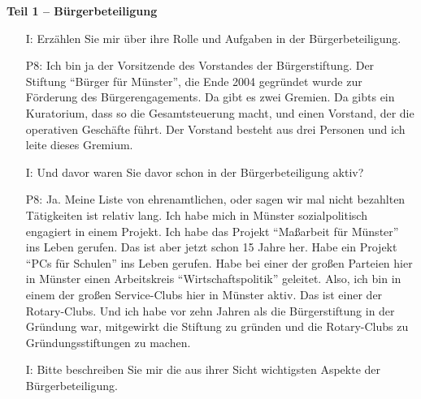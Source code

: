 \textbf{Teil 1 -- B{\"u}rgerbeteiligung}
\begin{itemize}
    \item[I:] Erz{\"a}hlen Sie mir {\"u}ber ihre Rolle und Aufgaben in der B{\"u}rgerbeteiligung.
    \item[P8:] Ich bin ja der Vorsitzende des Vorstandes der B{\"u}rgerstiftung. Der Stiftung "`B{\"u}rger f{\"u}r M{\"u}nster"', die Ende 2004 gegr{\"u}ndet wurde zur F{\"o}rderung des B{\"u}rgerengagements. Da gibt es zwei Gremien. Da gibts ein Kuratorium, dass so die Gesamtsteuerung macht, und einen Vorstand, der die operativen Gesch{\"a}fte f{\"u}hrt. Der Vorstand besteht aus drei Personen und ich leite dieses Gremium.
    \item[I:] Und davor waren Sie davor schon in der B{\"u}rgerbeteiligung aktiv?
    \item[P8:] Ja. Meine Liste von ehrenamtlichen, oder sagen wir mal nicht bezahlten T{\"a}tigkeiten ist relativ lang. Ich habe mich in M{\"u}nster sozialpolitisch engagiert in einem Projekt. Ich habe das Projekt "`Ma{\ss}arbeit f{\"u}r M{\"u}nster"' ins Leben gerufen. Das ist aber jetzt schon 15 Jahre her. Habe ein Projekt "`PCs f{\"u}r Schulen"' ins Leben gerufen. Habe bei einer der gro{\ss}en Parteien hier in M{\"u}nster einen Arbeitskreis "`Wirtschaftspolitik"' geleitet. Also, ich bin in einem der gro{\ss}en Service-Clubs hier in M{\"u}nster aktiv. Das ist einer der Rotary-Clubs. Und ich habe vor zehn Jahren als die B{\"u}rgerstiftung in der Gr{\"u}ndung war, mitgewirkt die Stiftung zu gr{\"u}nden und die Rotary-Clubs zu Gr{\"u}ndungsstiftungen zu machen.
    \item[I:] Bitte beschreiben Sie mir die aus ihrer Sicht wichtigsten Aspekte der B{\"u}rgerbeteiligung.

\end{itemize}
